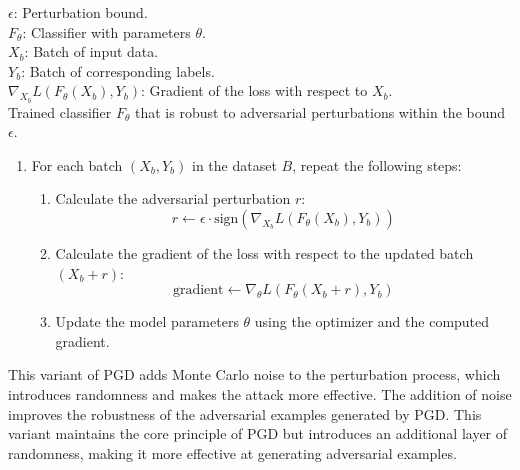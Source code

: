 $ \epsilon $: Perturbation bound. \\
$ F_\theta $: Classifier with parameters $ \theta $. \\
$ X_b $: Batch of input data. \\
$ Y_b $: Batch of corresponding labels. \\
$ \nabla_{X_b} L(F_\theta(X_b), Y_b) $: Gradient of the loss with respect to $ X_b $. \\

Trained classifier $ F_\theta $ that is robust to adversarial perturbations within the bound $ \epsilon $. \\

\begin{enumerate}
        \item For each batch $(X_b, Y_b)$ in the dataset $B$, repeat the following steps:
        \begin{enumerate}
            \item Calculate the adversarial perturbation $r$:
            \[
            r \leftarrow \epsilon \cdot \text{sign}\left( \nabla_{X_b} L(F_\theta(X_b), Y_b) \right)
            \]
            \item Calculate the gradient of the loss with respect to the updated batch $(X_b + r)$:
            \[
            \text{gradient} \leftarrow \nabla_{\theta} L(F_\theta(X_b + r), Y_b)
            \]
            \item Update the model parameters $\theta$ using the optimizer and the computed gradient.
        \end{enumerate}
    \end{enumerate}

This variant of PGD adds Monte Carlo noise to the perturbation process, which introduces randomness and makes the attack more effective. The addition of noise improves the robustness of the adversarial examples generated by PGD.
This variant maintains the core principle of PGD but introduces an additional layer of randomness, making it more effective at generating adversarial examples.
